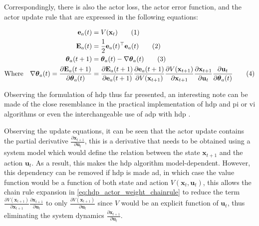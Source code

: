 \documentclass[../report.tex]{subfiles}
\begin{document}
Correspondingly, there is also the actor loss, the actor error function, and the actor update rule that are expressed in the following equations:

\begin{align*}
    \mathbf{e}_a(t) &= V(\mathbf{x}_t) \stepcounter{equation}\tag{\theequation}\label{eq:hdp_actor_td}\\
    \mathbf{E}_a(t) &= \frac{1}{2}\mathbf{e}_a(t)^{\top}\mathbf{e}_a(t)\stepcounter{equation}\tag{\theequation}\label{eq:hdp_actor_error_function}\\
    \boldsymbol{\theta}_a(t+1) &= \boldsymbol{\theta}_a(t) - \nabla \boldsymbol{\theta}_a(t) \stepcounter{equation}\tag{\theequation}\label{eq:hdp_actor_update}\\
    \text{Where} \quad \nabla \boldsymbol{\theta}_a(t)= \frac{\partial \mathbf{E}_a(t+1)}{\partial \boldsymbol{\theta}_a(t)}  &= \frac{\partial \mathbf{E}_a(t+1)}{\partial \mathbf{e}_a(t+1)}\frac{\partial \mathbf{e}_a(t+1)}{\partial V(\mathbf{x}_{t+1})} \frac{\partial V(\mathbf{x}_{t+1})}{\partial \mathbf{x}_{t+1}} \frac{\partial \mathbf{x}_{t+1}}{\partial \mathbf{u}_t} \frac{\partial \mathbf{u}_t}{\partial \boldsymbol{\theta}_a(t)} \stepcounter{equation}\tag{\theequation}\label{eq:hdp_actor_weight_chainrule}\\
\end{align*}

Observing the formulation of \ac{hdp} thus far presented, an interesting note can be made of the close resemblance in the practical implementation of \ac{hdp} and \ac{pi} or \ac{vi} algorithms or even the interchangeable use of \ac{adp} with \ac{hdp} \cite{costate_adp, policy_iteration_adp, mshdp_og}.

Observing the update equations, it can be seen that the actor update contains the partial derivative $\frac{\partial \mathbf{x}_{t+1}}{\partial \mathbf{u}_t}$, this is a derivative that needs to be obtained using a system model which would define the relation between the state $\mathbf{x}_{t+1}$ and the action $\mathbf{u}_t$. As a result, this makes the \ac{hdp} algorithm model-dependent. However, this dependency can be removed if \ac{hdp} is made \ac{ad}, in which case the value function would be a function of both state and action $V(\mathbf{x}_t, \mathbf{u}_t)$, this allows the chain rule expansion in \autoref{eq:hdp_actor_weight_chainrule} to reduce the term $\frac{\partial V(\mathbf{x}_{t+1})}{\partial \mathbf{x}_{t+1}} \frac{\partial \mathbf{x}_{t+1}}{\partial \mathbf{u}_t}$ to only $\frac{\partial V(\mathbf{x}_{t+1})}{\partial \mathbf{u}_t}$ since $V$ would be an explicit function of $\mathbf{u}_t$, thus eliminating the system dynamics $\frac{\partial \mathbf{x}_{t+1}}{\partial \mathbf{u}_t}$.
\end{document}

